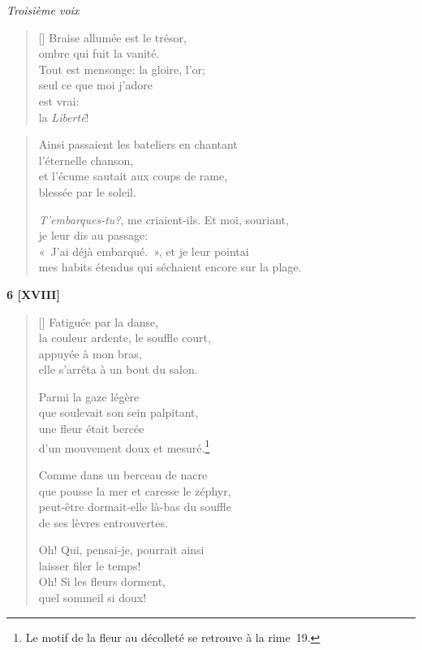 \documentclass[a4paper,12pt]{book}
\begin{document}
\begin{center} \emph{Troisième voix} \end{center}

\begin{verse}[\versewidth]
  Braise allumée est le trésor, \\
  ombre qui fuit la vanité. \\
  Tout est mensonge: la gloire, l'or; \\
  seul ce que moi j'adore \\
  est vrai: \\
  la \emph{Liberté}!
\end{verse}

\begin{verse}
  Ainsi passaient les bateliers en chantant \\
  l'éternelle chanson, \\
  et l'écume sautait aux coups de rame, \\
  blessée par le soleil.

  \emph{T'embarques-tu?}, me criaient-ils. Et moi, souriant, \\
  je leur dis au passage: \\
  «~J'ai déjà embarqué.~», et je leur pointai \\
  mes habits étendus qui séchaient encore sur la plage.
\end{verse}

\bigskip

\begin{center}
  \textbf{6 [XVIII]}
\end{center}

\settowidth{\versewidth}{que pousse la mer et caresse le zéphir,}

\begin{verse}[\versewidth]
  Fatiguée par la danse, \\
  la couleur ardente, le souffle court, \\
  appuyée à mon bras, \\
  elle s'arrêta à un bout du salon.

  Parmi la gaze légère \\
  que soulevait son sein palpitant, \\
  une fleur était bercée \\
  d'un mouvement doux et mesuré.\footnote{Le motif de la fleur au
  décolleté se retrouve à la rime~19.}

  Comme dans un berceau de nacre \\
  que pousse la mer et caresse le zéphyr, \\
  peut-être dormait-elle là-bas du souffle \\
  de ses lèvres entrouvertes.

  Oh! Qui, pensai-je, pourrait ainsi \\
  laisser filer le temps! \\
  Oh! Si les fleurs dorment, \\
  quel sommeil si doux!
\end{verse}
\end{document}
